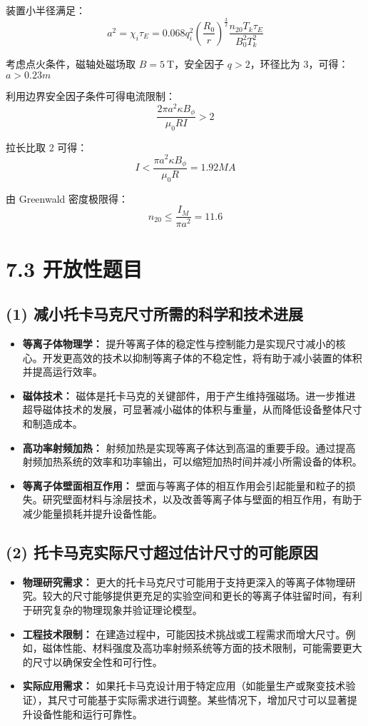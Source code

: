 \documentclass{article}
\begin{document}
装置小半径满足：$$a^2 = \chi_i \tau_E = 0.068 q_i^2 \left( \frac{R_0}{r} \right)^{\frac{3}{2}} \frac{n_{20} T_k \tau_E}{B_0^2 T_k^2}$$

考虑点火条件，磁轴处磁场取 $ B = 5 \ \text{T} $，安全因子 $ q > 2 $，环径比为 3，可得：$a > 0.23m$

利用边界安全因子条件可得电流限制：$$\frac{2 \pi a^2 \kappa B_{\phi}}{\mu_0 R I} > 2$$

拉长比取 2 可得：$$I < \frac{\pi a^2 \kappa B_{\phi}}{\mu_0 R} = 1.92MA$$

由 Greenwald 密度极限得：$$n_{20} \leq \frac{I_M}{\pi a^2} = 11.6$$

\section*{7.3 \quad 开放性题目}

\subsection*{(1) 减小托卡马克尺寸所需的科学和技术进展}

\begin{itemize}
    \item \textbf{等离子体物理学：} 提升等离子体的稳定性与控制能力是实现尺寸减小的核心。开发更高效的技术以抑制等离子体的不稳定性，将有助于减小装置的体积并提高运行效率。
    \item \textbf{磁体技术：} 磁体是托卡马克的关键部件，用于产生维持强磁场。进一步推进超导磁体技术的发展，可显著减小磁体的体积与重量，从而降低设备整体尺寸和制造成本。
    \item \textbf{高功率射频加热：} 射频加热是实现等离子体达到高温的重要手段。通过提高射频加热系统的效率和功率输出，可以缩短加热时间并减小所需设备的体积。
    \item \textbf{等离子体壁面相互作用：} 壁面与等离子体的相互作用会引起能量和粒子的损失。研究壁面材料与涂层技术，以及改善等离子体与壁面的相互作用，有助于减少能量损耗并提升设备性能。
\end{itemize}

\subsection*{(2) 托卡马克实际尺寸超过估计尺寸的可能原因}

\begin{itemize}
    \item \textbf{物理研究需求：} 更大的托卡马克尺寸可能用于支持更深入的等离子体物理研究。较大的尺寸能够提供更充足的实验空间和更长的等离子体驻留时间，有利于研究复杂的物理现象并验证理论模型。
    \item \textbf{工程技术限制：} 在建造过程中，可能因技术挑战或工程需求而增大尺寸。例如，磁体性能、材料强度及高功率射频系统等方面的技术限制，可能需要更大的尺寸以确保安全性和可行性。
    \item \textbf{实际应用需求：} 如果托卡马克设计用于特定应用（如能量生产或聚变技术验证），其尺寸可能基于实际需求进行调整。某些情况下，增加尺寸可以显著提升设备性能和运行可靠性。
\end{itemize}
\end{document}
